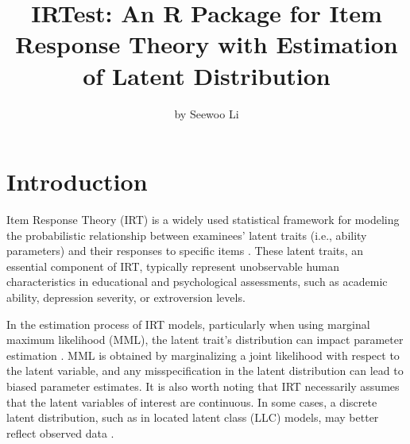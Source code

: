 \title{IRTest: An R Package for Item Response Theory with Estimation of Latent Distribution}


\author{by Seewoo Li}

\maketitle


\hypertarget{introduction}{%
\section{Introduction}\label{introduction}}

Item Response Theory (IRT) is a widely used statistical framework for
modeling the probabilistic relationship between examinees' latent traits
(i.e., ability parameters) and their responses to specific items
\citep{deAyala:2009, Hambleton+Swaminathan+Rogers:1991, vanderLinden:2016}.
These latent traits, an essential component of IRT, typically represent
unobservable human characteristics in educational and psychological
assessments, such as academic ability, depression severity, or
extroversion levels.

In the estimation process of IRT models, particularly when using
marginal maximum likelihood (MML), the latent trait's distribution can
impact parameter estimation \citep{Woods:2015}. MML is obtained by
marginalizing a joint likelihood with respect to the latent variable,
and any misspecification in the latent distribution can lead to biased
parameter estimates. It is also worth noting that IRT necessarily
assumes that the latent variables of interest are continuous. In some
cases, a discrete latent distribution, such as in located latent class
(LLC) models, may better reflect observed data \citep[see][]{Clogg:1981, Follmann:1988, Haberman:2005, McCutcheon:1987, Xu+vonDavier:2008}.

